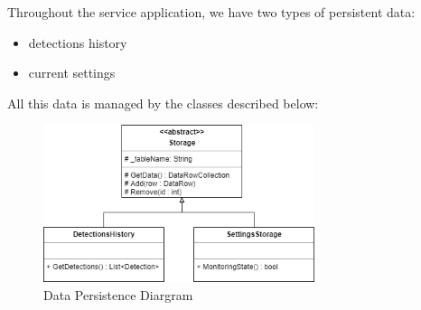     Throughout the service application, we have two types of persistent data:
    \begin{itemize}
        \item detections history
        \item current settings
    \end{itemize}

    All this data is managed by the classes described below:

    \begin{figure}[H]
        \centering
        \includegraphics[width=300px, keepaspectratio]{img/storage_diagram.png}
        \caption{Data Persistence Diargram}
        \label{fig:storage_diagram}
    \end{figure}

    


        
